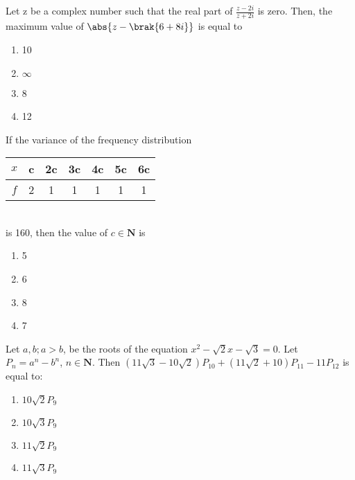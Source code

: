     \item Let z be a complex number such that the real part of $\frac{z-2i}{z+2i}$ is zero. Then, the maximum value of $\abs{z-\brak{6+8i}}$ is equal to
    \begin{enumerate}
        \item 10
        \item $\infty$
        \item 8
        \item 12
    \end{enumerate}
    \item If the variance of the frequency distribution \\
   \begin{tabular}{|c|c|c|c|c|c|c|} 
        \hline
            $x$ & c & 2c & 3c & 4c & 5c & 6c \\ 
        \hline
            $f$ & 2 & 1 & 1 & 1 & 1 & 1 \\ 
        \hline
    \end{tabular}\\
    is 160, then the value of $c\in\mathbf{N}$ is
    \begin{enumerate}
        \item 5
        \item 6
        \item 8
        \item 7
    \end{enumerate}
   \item Let $a, b ;a > b$, be the roots of the equation $x^2 - \sqrt{2}x - \sqrt{3} = 0$. Let $P_n = a^n-b^n$, $n\in\mathbf{N}$. Then $(11\sqrt{3} - 10\sqrt{2})P_{10} + (11\sqrt{2} + 10)P_{11} - 11P_{12}$ is equal to:
    \begin{enumerate}
        \item $10\sqrt{2} P_9$
        \item $10\sqrt{3} P_9$
        \item $11\sqrt{2} P_9$
        \item $11\sqrt{3} P_9$
    \end{enumerate}

